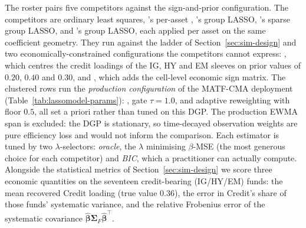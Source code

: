 \documentclass[article]{jss}
\begin{document}
The roster pairs five competitors against the sign-and-prior
configuration. The competitors are ordinary least squares,
's per-asset , 's group LASSO, 's sparse group LASSO, and 's group LASSO,
each applied per asset on the same coefficient geometry. They run
against the  ladder of Section~\ref{sec:sim-design} and two
economically-constrained configurations the competitors cannot express:
, which centres the credit loadings of the IG, HY and
EM sleeves on prior values of $0.20$, $0.40$ and $0.30$, and
, which adds the cell-level economic sign matrix.
The clustered  rows run the \emph{production
configuration} of the MATF-CMA deployment
(Table~\ref{tab:lassomodel-params}): ,
gate $\tau = 1.0$, and adaptive reweighting with floor $0.5$, all set
a priori rather than tuned on this DGP. The production EWMA span is
excluded: the DGP is stationary, so time-decayed observation weights
are pure efficiency loss and would not inform the comparison.
Each estimator is tuned by two $\lambda$-selectors: \emph{oracle}, the
$\lambda$ minimising $\beta$-MSE (the most generous choice for each
competitor) and \emph{BIC}, which a practitioner can actually
compute. Alongside the statistical metrics of
Section~\ref{sec:sim-design} we score three economic quantities on the
seventeen credit-bearing (IG/HY/EM) funds: the mean recovered Credit
loading (true value $0.36$), the error in Credit's share of those funds'
systematic variance, and the relative Frobenius error of the systematic
covariance $\hat{\bm{\beta}} \bm{\Sigma}_F \hat{\bm{\beta}}^\top$.
\end{document}
